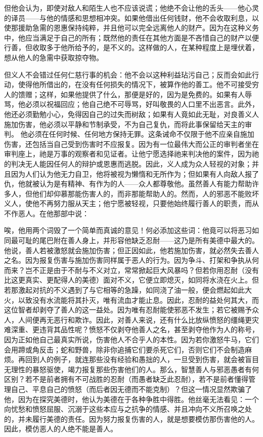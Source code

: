 但他会认为，即使对敌人和陌生人也不应该说谎；他绝不会让他的舌头——他心灵的译员——与他的情感和思想相冲突。如果他借出任何钱财，他不会收取利息，以使那援助急需的恩惠保持纯粹，并且他可以完全远离他人的财产。因为在这种义务中，他应当满足于自己的所有；既然他的责任在其他方面是不吝惜自己的财产以便行善，但收取多于他所给予的，是不义的。这样做的人，在某种程度上是埋伏着，想从他人的急需中获取掠夺物。\par

但义人不会错过任何仁慈行事的机会：他不会以这种利益玷污自己；反而会如此行动，使得他所借出的，在没有任何损失的情况下，被算作他的善工。他不可接受穷人的馈赠；这样，如果他提供了什么，那便是好的，因为是免费的。如果有人辱骂，他必须以祝福回应；他自己绝不可辱骂，好叫敬畏的人口里不出恶言。此外，他还必须勤勉小心，免得因自己的过失而树敌；如果有人竟如此无耻，对良善义人施加伤害，他必须以平静和节制承受，不为自己复仇，而将此事保留给天主的审判。 他必须在任何时候、任何地方保持无罪。这条诫命不仅限于他不应亲自施加伤害，还包括当自己受到伤害时不应报复。因为有一位最伟大而公正的审判者坐在审判座上，祂是万事的观察者和见证者。让他宁愿选择祂来判决他的案件，因为祂的判决无人能因任何人的辩护或恩惠而逃脱。因此，义人成为众人轻视的对象；并且因为人们认为他无力自卫，他将被视为懒惰和无所作为；但如果有人向敌人报了仇，他就被认为是有精神、有作为的人——众人都尊敬他。虽然善人有能力帮助许多人，但他们却仰慕那能伤害人的，而非那能帮助人的。然而，人的邪恶不能败坏义人，使他不再努力服从天主；他宁愿被轻视，只要他始终履行善人的职责，而从不作恶人。在他那部中说：\par

唉，他用两个词毁了一个简单而真诚的意见！何必添加这些词：他竟可以将恶习如同最可耻的尾巴附在善人身上，并形容他缺乏忍耐——这乃是所有美德中最大的。他说，善人若被激怒就会施加伤害；但正因如此，他若施加伤害，就必然失去善人之名。因为报复伤害与施加伤害同样属于恶人的行为。因为争斗、打架和争执从何而来？岂不正是由于不耐与不义对立，常常掀起巨大风暴吗？但若你用忍耐（没有比这更真实、更配得人的美德）面对不义，它便立即熄灭，如同将水浇在火上。但若那激起对抗的不义遇到了与它相等的急躁，如同浇了油一般，便会燃起如此大火，以致没有水流能将其扑灭，唯有流血才能止息。因此，忍耐的益处何其大，而这位智者却剥夺了善人的这一益处。因为唯有忍耐能使邪恶不发生；若它被赐予众人，人间便再无恶行和欺诈。因此，对善人来说，还有什么比放纵愤怒的缰绳更灾难深重、更违背其品性呢？愤怒不仅剥夺他善人之名，甚至剥夺他作为人的称号，因为正如他自己最真实所说，伤害他人不合乎人的本性。因为若你激怒牛马，它们会用蹄或角反击；蛇和野兽，除非你追捕它们要杀死它们，否则它们不会制造麻烦。再回到人的例子，就连那些没有经验和愚拙的人，一旦受到伤害，就会被盲目无理性的暴怒驱使，竭力报复那些伤害他们的人。那么，智慧善人与邪恶愚者有何区别？若不是前者拥有不可战胜的忍耐（而愚者缺乏此忍耐），若不是前者懂得管理自己、平息自己的愤怒（而后者因无德而不能克制）？但这一情况显然欺骗了他，因为在探究美德时，他认为美德在于各种争胜中得胜。他丝毫无法看见：一个向忧愁和愤怒屈服、沉溺于这些本应与之抗争的情感、并且冲向不义所召唤之处的，并未履行美德的责任。因为努力报复伤害的人，就是想要模仿那伤害他的人。因此，模仿恶人的人绝不能是善人。\par

